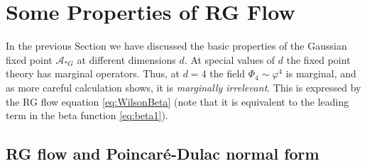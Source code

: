 \section{Some Properties of RG Flow}

In the previous Section we have discussed the basic properties of the Gaussian
fixed point $\mathcal A_{*G}$ at different dimensions $d$. At special values of
$d$ the fixed point theory has marginal operators. Thus, at $d=4$ the field
$\Phi_4\sim\varphi^4$ is marginal, and as more careful calculation shows, it is
\emph{marginally irrelevant}. This is expressed by the RG flow equation
\eqref{eq:WilsonBeta} (note that it is equivalent to the leading term in the beta
function \eqref{eq:beta1}).

\subsection*{RG flow and Poincar\'e-Dulac normal form}

